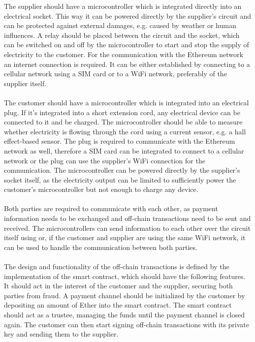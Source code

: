 The supplier should have a microcontroller which is integrated directly into an electrical socket.
This way it can be powered directly by the supplier's circuit and can be protected against external damages, e.g. caused by weather or human influences.
A relay should be placed between the circuit and the socket, which can be switched on and off by the microcontroller to start and stop the supply of electricity to the customer.
For the communication with the Ethereum network an internet connection is required.
It can be either established by connecting to a cellular network using a SIM card or to a WiFi network, preferably of the supplier itself.
\\\\
The customer should have a microcontroller which is integrated into an electrical plug.
If it's integrated into a short extension cord, any electrical device can be connected to it and be charged.
The microcontroller should be able to measure whether electricity is flowing through the cord using a current sensor, e.g. a hall effect-based sensor.
The plug is required to communicate with the Ethereum network as well, therefore a SIM card can be integrated to connect to a cellular network or the plug can use the supplier's WiFi connection for the communication.
The microcontroller can be powered directly by the supplier's socket itself, as the electricity output can be limited to sufficiently power the customer's microcontroller but not enough to charge any device.
\\\\
Both parties are required to communicate with each other, as payment information needs to be exchanged and off-chain transactions need to be sent and received.
The microcontrollers can send information to each other over the circuit itself using  or, if the customer and supplier are using the same WiFi network, it can be used to handle the communication between both parties.
\\\\
The design and functionality of the off-chain transactions is defined by the implementation of the smart contract, which should have the following features.
It should act in the interest of the customer and the supplier, securing both parties from fraud.
A payment channel should be initialized by the customer by depositing an amount of Ether into the smart contract.
The smart contract should act as a trustee, managing the funds until the payment channel is closed again.
The customer can then start signing off-chain transactions with its private key and sending them to the supplier.
